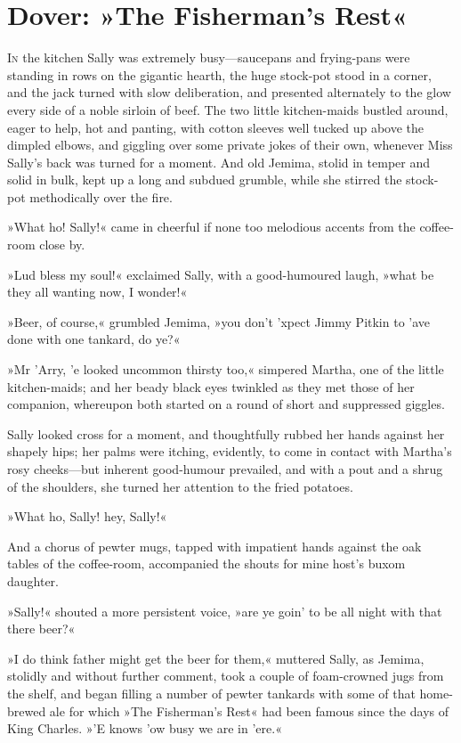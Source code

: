 
\chapter{Dover: »The Fisherman's Rest«}
\lettrine[lines=4]{I}{n} the kitchen Sally was extremely busy—sauce\-pans and frying-pans were standing in rows on the gigantic hearth, the huge stock-pot stood in a corner, and the jack turned with slow deliberation, and presented alternately to the glow every side of a noble sirloin of beef. The two little kitchen-maids bustled around, eager to help, hot and panting, with cotton sleeves well tucked up above the dimpled elbows, and giggling over some private jokes of their own, whenever Miss Sally's back was turned for a moment. And old Jemima, stolid in temper and solid in bulk, kept up a long and subdued grumble, while she stirred the stock-pot methodically over the fire.

»What ho! Sally!« came in cheerful if none too melodious accents from the coffee-room close by.

»Lud bless my soul!« exclaimed Sally, with a good-humoured laugh, »what be they all wanting now, I wonder!«

»Beer, of course,« grumbled Jemima, »you don't 'xpect Jimmy Pitkin to 'ave done with one tankard, do ye?«

»Mr 'Arry, 'e looked uncommon thirsty too,« simpered Martha, one of the little kitchen-maids; and her beady black eyes twinkled as they met those of her companion, whereupon both started on a round of short and suppressed giggles.

Sally looked cross for a moment, and thoughtfully rubbed her hands against her shapely hips; her palms were itching, evidently, to come in contact with Martha's rosy cheeks—but inherent good-humour prevailed, and with a pout and a shrug of the shoulders, she turned her attention to the fried potatoes.

»What ho, Sally! hey, Sally!«

And a chorus of pewter mugs, tapped with impatient hands against the oak tables of the coffee-room, accompanied the shouts for mine host's buxom daughter.

»Sally!« shouted a more persistent voice, »are ye goin' to be all night with that there beer?«

»I do think father might get the beer for them,« muttered Sally, as Jemima, stolidly and without further comment, took a couple of foam-crowned jugs from the shelf, and began filling a number of pewter tankards with some of that home-brewed ale for which »The Fisherman's Rest« had been famous since the days of King Charles. »'E knows 'ow busy we are in 'ere.«

